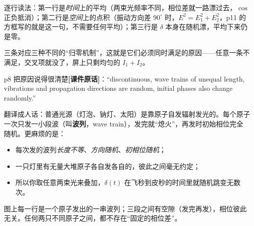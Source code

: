 \documentclass[11pt]{ctexart}
\begin{document}
逐行读法：第一行是\emph{时间}上的平均（两束光频率不同，相位差就一路漂过去，$\cos$ 正负抵消）；第二行是\emph{空间}上的点积（振动方向差 $90^\circ$ 时，$E^2=E_1^2+E_2^2$，p11 的方框写的就是这一句，不需要任何平均）；第三行是 $\delta$ 本身在随机漂，平均下来仍是零。

三条对应三种不同的“归零机制”，这就是它们必须同时满足的原因——任意一条不满足，交叉项就没了，屏上只剩均匀的 $I_1+I_2$。


p8 把原因说得很清楚\textbf{[课件原话]}：“discontinuous, wave trains of unequal length, vibrations and propagation directions are random, initial phases also change randomly.”

翻译成人话：普通光源（灯泡、钠灯、太阳）是靠原子自发辐射发光的。每个原子一次只发一小段波（叫\textbf{波列}，wave train），发完就“熄火”，再发时初始相位完全随机。更麻烦的是：

\begin{itemize}
\item 每次发的波列\emph{长度不等}、\emph{方向随机}、\emph{初相位随机}；
\item 一只灯里有无量大堆原子各自发各自的，彼此之间毫无约定；
\item 所以你取任意两束光来叠加，$\delta(t)$ 在飞秒到皮秒的时间里就随机跳变无数次。
\end{itemize}

\begin{center}
\end{center}

图上每一行是一个原子发出的一串波列；三段之间有空隙（发完再发），相位彼此无关。任何两只不同原子之间，都不存在“固定的相位差”。
\end{document}

